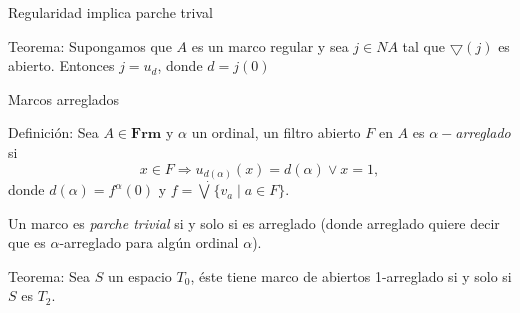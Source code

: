 \documentclass[compress,12pt]{beamer}
\begin{document}
\begin{frame}{Regularidad implica parche trival}
	\begin{block}{Teorema:}
		Supongamos que $A$ es un marco regular y sea $j\in NA$ tal que $\bigtriangledown (j)$ es abierto. Entonces $j=u_d$, donde $d=j(0)$
	\end{block}

\end{frame}    

\begin{frame}{Marcos arreglados}
	\begin{block}{Definición:}
		Sea $A\in \mathbf{Frm}$ y $\alpha$ un ordinal, un filtro abierto $F$ en $A$ es $\alpha-$\emph{arreglado} si \[x\in F\Rightarrow u_{d(\alpha)}(x)=d(\alpha)\vee x=1,\] donde $d(\alpha)=f^{\alpha}(0)$ y $f=\dot\bigvee\{v_a\mid a\in F\}$.
		\end{block}
\end{frame}

\begin{frame}
	Un marco es \emph{parche trivial} si y solo si es arreglado (donde arreglado quiere decir que es $\alpha$-arreglado para algún ordinal $\alpha$).

	\begin{block}{Teorema:}
		Sea $S$ un espacio $T_{0}$, éste tiene \alert<4->{marco de abiertos 1-arreglado si y solo si $S$ es $T_2$}.
		\end{block}
\end{frame}
\end{document}
